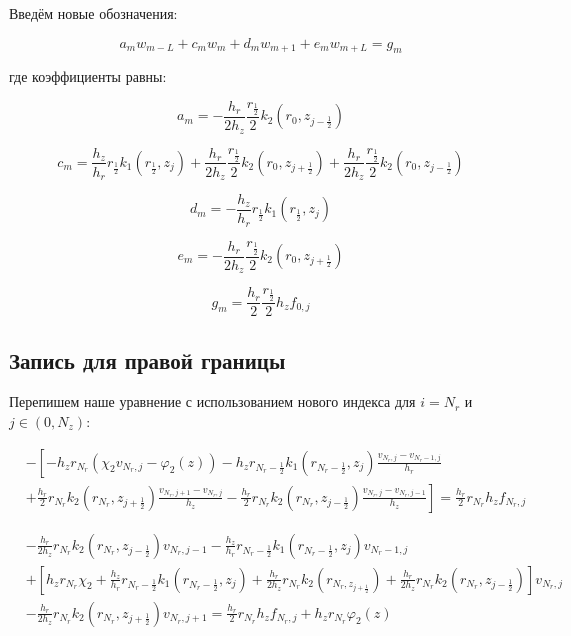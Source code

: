 Введём новые обозначения:

\[
  a_m w_{m - L} + c_m w_m + d_m w_{m + 1} + e_m w_{m + L} = g_m
\]

где коэффициенты равны:

\[
  a_m = - \frac{h_r}{2 h_z} \frac{r_{\frac{1}{2}}}{2} k_2(r_0, z_{j - \frac{1}{2}})
\]

\[
  c_m = \frac{h_z}{h_r} r_{\frac{1}{2}} k_1(r_{\frac{1}{2}}, z_j) + \frac{h_r}{2 h_z} \frac{r_{\frac{1}{2}}}{2} k_2(r_0, z_{j+\frac{1}{2}})
  + \frac{h_r}{2 h_z} \frac{r_{\frac{1}{2}}}{2} k_2(r_0, z_{j -\frac{1}{2}})
\]

\[
  d_m = - \frac{h_z}{h_r} r_{\frac{1}{2}} k_1(r_{\frac{1}{2}}, z_j)
\]

\[
  e_m = - \frac{h_r}{2 h_z} \frac{r_{\frac{1}{2}}}{2} k_2(r_0, z_{j + \frac{1}{2}})
\]

\[
  g_m = \frac{h_r}{2} \frac{r_{\frac{1}{2}}}{2} h_z f_{0, j}
\]

\subsection{Запись для правой границы}
Перепишем наше уравнение с использованием нового индекса для $i = N_r$ и $ j \in (0, N_z) $:

\begin{align*}
  &- \left [ 
  -h_z r_{N_r} ( \chi_2 v_{N_r, j} - \varphi_2(z))
  - h_z r_{N_r-\frac{1}{2}} k_1(r_{N_r-\frac{1}{2}}, z_j) \frac{v_{N_r, j} - v_{N_r - 1, j}}{h_{r}}
  \right . \\
  &\left .
  + \frac{h_r}{2} r_{N_r} k_2(r_{N_r}, z_{j+\frac{1}{2}}) \frac{v_{N_r, j + 1} - v_{N_r, j}}{h_{z}}
  - \frac{h_r}{2} r_{N_r} k_2(r_{N_r}, z_{j-\frac{1}{2}}) \frac{v_{N_r, j} - v_{N_r, j - 1}}{h_z}
  \right ]  = \frac{h_r}{2} r_{N_r} h_z f_{N_r, j}
\end{align*}

\begin{align*}
  & - \frac{h_r}{2h_z} r_{N_r} k_2(r_{N_r}, z_{j - \frac{1}{2}}) v_{N_r, j - 1}
  - \frac{h_z}{h_r} r_{N_r - \frac{1}{2}} k_1(r_{N_r - \frac{1}{2}}, z_j) v_{N_r - 1, j} \\
  & +\left[
    h_z r_{N_r} \chi_2  + \frac{h_z}{h_r} r_{N_r - \frac{1}{2}} k_1(r_{N_r -\frac{1}{2}}, z_j)
    + \frac{h_r}{2 h_z} r_{N_r} k_2(r_{N_r, z_{j + \frac{1}{2}}})
    + \frac{h_r}{2 h_z} r_{N_r} k_2 (r_{N_r}, z_{j - \frac{1}{2}})
  \right] v_{N_r, j} \\
  &- \frac{h_r}{2 h_z} r_{N_r} k_2(r_{N_r}, z_{j + \frac{1}{2}}) v_{N_r, j + 1}
  = \frac{h_r}{2} r_{N_r} h_z f_{N_r, j} + h_z r_{N_r} \varphi_2(z)
\end{align*}

